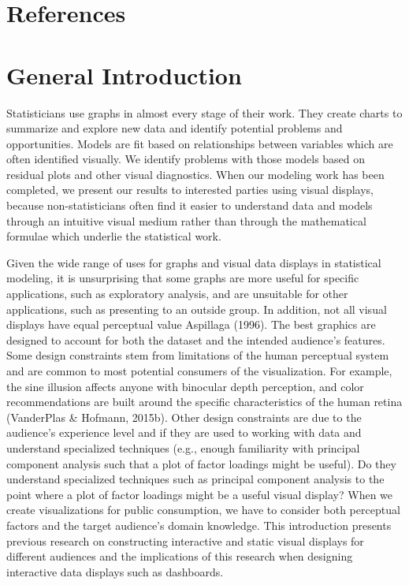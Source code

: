 \documentclass[print]{nuthesis}
\begin{document}
\backmatter

\hypertarget{references}{%
\chapter*{References}\label{references}}

\noindent

\setlength{\parindent}{-0.20in}
\setlength{\leftskip}{0.20in}
\setlength{\parskip}{8pt}

\hypertarget{general-introduction}{%
\chapter{General Introduction}\label{general-introduction}}

Statisticians use graphs in almost every stage of their work.
They create charts to summarize and explore new data and identify potential problems and opportunities.
Models are fit based on relationships between variables which are often identified visually.
We identify problems with those models based on residual plots and other visual diagnostics.
When our modeling work has been completed, we present our results to interested parties using visual displays, because non-statisticians often find it easier to understand data and models through an intuitive visual medium rather than through the mathematical formulae which underlie the statistical work.

Given the wide range of uses for graphs and visual data displays in statistical modeling, it is unsurprising that some graphs are more useful for specific applications, such as exploratory analysis, and are unsuitable for other applications, such as presenting to an outside group.
In addition, not all visual displays have equal perceptual value Aspillaga (1996).
The best graphics are designed to account for both the dataset and the intended audience's features.
Some design constraints stem from limitations of the human perceptual system and are common to most potential consumers of the visualization.
For example, the sine illusion affects anyone with binocular depth perception, and color recommendations are built around the specific characteristics of the human retina (VanderPlas \& Hofmann, 2015b).
Other design constraints are due to the audience's experience level and if they are used to working with data and understand specialized techniques (e.g., enough familiarity with principal component analysis such that a plot of factor loadings might be useful).
Do they understand specialized techniques such as principal component analysis to the point where a plot of factor loadings might be a useful visual display?
When we create visualizations for public consumption, we have to consider both perceptual factors and the target audience's domain knowledge.
This introduction presents previous research on constructing interactive and static visual displays for different audiences and the implications of this research when designing interactive data displays such as dashboards.
\end{document}
